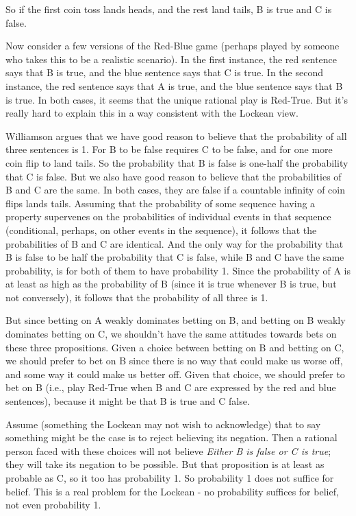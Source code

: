 \documentclass[
  11pt,
]{book}
\begin{document}
So if the first coin toss lands heads, and the rest land tails, B is true and C is false.

Now consider a few versions of the Red-Blue game (perhaps played by someone who takes this to be a realistic scenario). In the first instance, the red sentence says that B is true, and the blue sentence says that C is true. In the second instance, the red sentence says that A is true, and the blue sentence says that B is true. In both cases, it seems that the unique rational play is Red-True. But it's really hard to explain this in a way consistent with the Lockean view.

Williamson argues that we have good reason to believe that the probability of all three sentences is 1. For B to be false requires C to be false, and for one more coin flip to land tails. So the probability that B is false is one-half the probability that C is false. But we also have good reason to believe that the probabilities of B and C are the same. In both cases, they are false if a countable infinity of coin flips lands tails. Assuming that the probability of some sequence having a property supervenes on the probabilities of individual events in that sequence (conditional, perhaps, on other events in the sequence), it follows that the probabilities of B and C are identical. And the only way for the probability that B is false to be half the probability that C is false, while B and C have the same probability, is for both of them to have probability 1. Since the probability of A is at least as high as the probability of B (since it is true whenever B is true, but not conversely), it follows that the probability of all three is 1.

But since betting on A weakly dominates betting on B, and betting on B weakly dominates betting on C, we shouldn't have the same attitudes towards bets on these three propositions. Given a choice between betting on B and betting on C, we should prefer to bet on B since there is no way that could make us worse off, and some way it could make us better off. Given that choice, we should prefer to bet on B (i.e., play Red-True when B and C are expressed by the red and blue sentences), because it might be that B is true and C false.

Assume (something the Lockean may not wish to acknowledge) that to say something might be the case is to reject believing its negation. Then a rational person faced with these choices will not believe \emph{Either B is false or C is true}; they will take its negation to be possible. But that proposition is at least as probable as C, so it too has probability 1. So probability 1 does not suffice for belief. This is a real problem for the Lockean - no probability suffices for belief, not even probability 1.
\end{document}

